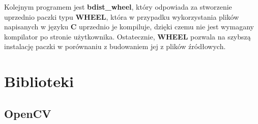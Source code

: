 \quad Kolejnym programem jest \textbf{bdist\_wheel}, który odpowiada za stworzenie uprzednio paczki typu \textbf{WHEEL}, która w przypadku wykorzystania plików napisanych w języku \textbf{C} uprzednio je kompiluje, dzięki czemu nie jest wymagany kompilator po stronie użytkownika. Ostatecznie, \textbf{WHEEL} pozwala na szybszą instalację paczki w porównaniu z budowaniem jej z plików źródłowych. 









\section{Biblioteki}

\subsection{OpenCV}

